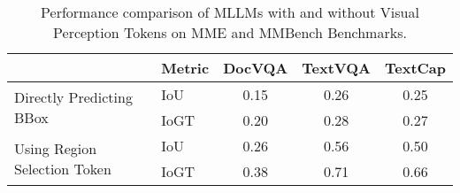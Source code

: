 \begin{table*}[t]
    \centering
    \begin{tabular}{@{}llccc@{}}
    \toprule
                                                    & \multicolumn{1}{c}{Metric} & DocVQA & TextVQA & TextCap \\ \midrule
    \multirow{2}{*}{Directly   Predicting BBox}     & IoU                        & 0.15   & 0.26    & 0.25    \\
                                                    & IoGT                       & 0.20   & 0.28    & 0.27    \\
    \multirow{2}{*}{Using   Region Selection Token} & IoU                        & 0.26   & 0.56    & 0.50    \\
                                                    & IoGT                       & 0.38   & 0.71    & 0.66    \\ \bottomrule
    \end{tabular}
    \caption{Performance comparison of MLLMs with and without Visual Perception Tokens on MME and MMBench Benchmarks.}
    \label{tab:iou}
\end{table*}